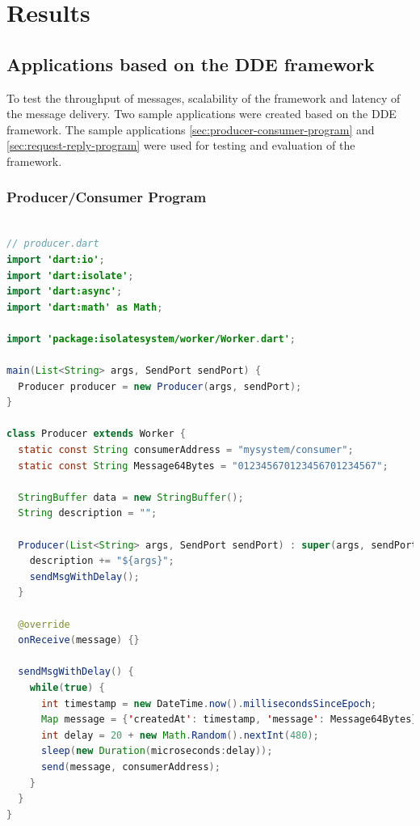\chapter{Results}
\label{chapter:results}

\section{Applications based on the DDE framework}
\label{sec:result-applications}
  To test the throughput of messages, scalability of the framework and latency of the message delivery. Two sample applications were created based on the DDE framework. The sample applications \autoref{sec:producer-consumer-program} and
  \autoref{sec:request-reply-program} were used for testing and evaluation of the framework.

\subsection{Producer/Consumer Program}
\label{sec:producer-worker}
\begin{lstlisting}[language=java, firstnumber=1, caption=Basic version of Producer Worker of Producer-Consumer application, label=lst:producer]

// producer.dart
import 'dart:io';
import 'dart:isolate';
import 'dart:async';
import 'dart:math' as Math;

import 'package:isolatesystem/worker/Worker.dart';

main(List<String> args, SendPort sendPort) {
  Producer producer = new Producer(args, sendPort);
}

class Producer extends Worker {
  static const String consumerAddress = "mysystem/consumer";
  static const String Message64Bytes = "012345670123456701234567";

  StringBuffer data = new StringBuffer();
  String description = "";

  Producer(List<String> args, SendPort sendPort) : super(args, sendPort) {
    description += "${args}";
    sendMsgWithDelay();
  }

  @override
  onReceive(message) {}

  sendMsgWithDelay() {
    while(true) {
      int timestamp = new DateTime.now().millisecondsSinceEpoch;
      Map message = {'createdAt': timestamp, 'message': Message64Bytes};
      int delay = 20 + new Math.Random().nextInt(480);
      sleep(new Duration(microseconds:delay));
      send(message, consumerAddress);
    }
  }
}
\end{lstlisting}


